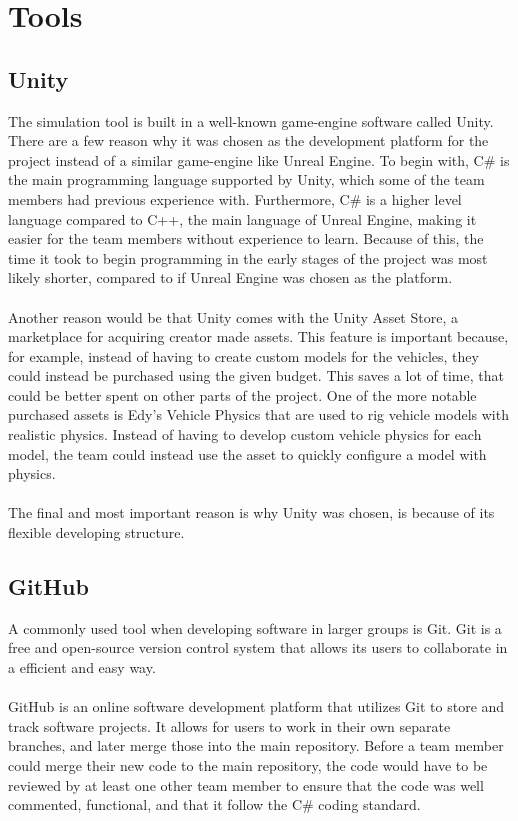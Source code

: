 
\section{Tools}

\subsection{Unity}

The simulation tool is built in a well-known game-engine software called Unity. There are a few reason why it was chosen as the development platform for the project instead of a similar game-engine like Unreal Engine. To begin with, C\# is the main programming language supported by Unity, which some of the team members had previous experience with. Furthermore, C\# is a higher level language compared to C++, the main language of Unreal Engine, making it easier for the team members without experience to learn. Because of this, the time it took to begin programming in the early stages of the project was most likely shorter, compared to if Unreal Engine was chosen as the platform.
\\\\
Another reason would be that Unity comes with the Unity Asset Store, a marketplace for acquiring creator made assets. This feature is important because, for example, instead of having to create custom models for the vehicles, they could instead be purchased using the given budget. This saves a lot of time, that could be better spent on other parts of the project. One of the more notable purchased assets is Edy's Vehicle Physics that are used to rig vehicle models with realistic physics. Instead of having to develop custom vehicle physics for each model, the team could instead use the asset to quickly configure a model with physics.
\\\\
The final and most important reason is why Unity was chosen, is because of its flexible developing structure. 

\subsection{GitHub}

A commonly used tool when developing software in larger groups is Git. Git is a free and open-source version control system that allows its users to collaborate in a efficient and easy way. 
\\\\
GitHub is an online software development platform that utilizes Git to store and track software projects. It allows for users to work in their own separate branches, and later merge those into the main repository. Before a team member could merge their new code to the main repository, the code would have to be reviewed by at least one other team member to ensure that the code was well commented, functional, and that it follow the C\# coding standard.


